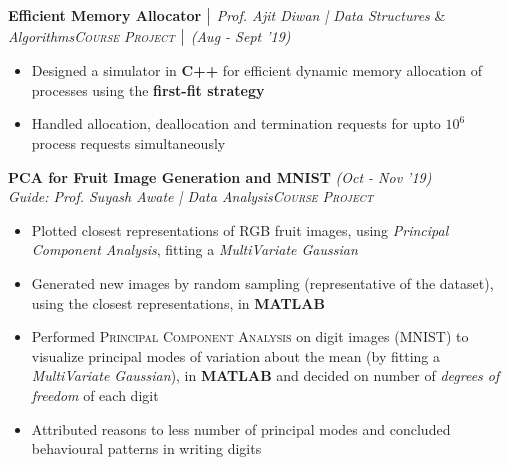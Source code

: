 \documentclass{article}
\begin{document}
\vspace{-5pt}
\textbf{Efficient Memory Allocator} $\bigm|$ {\it Prof. Ajit Diwan | Data Structures} \& {\it Algorithms}\hfill{\sl \small \textsc{Course Project} $\bigm|$ (Aug - Sept '19)}\\
\vspace{-19pt}
\begin{itemize}[itemsep = -1 mm, leftmargin=*]
  \item Designed a simulator in \textbf{C++} for efficient dynamic memory allocation of processes using the \textbf{first-fit strategy}
   \item Handled allocation, deallocation and termination requests for upto $10^{\text{6}}$ process requests simultaneously
\end{itemize}
\vspace{-5pt}
\textbf{PCA for Fruit Image Generation and MNIST} \hfill{\sl \small (Oct - Nov '19)}\\{\it Guide: Prof. Suyash Awate | Data Analysis}\hfill{\sl \small \textsc{Course Project}}\\
\vspace{-19pt}
\begin{itemize}[itemsep = -1 mm, leftmargin=*]
   \item Plotted closest representations of RGB fruit images, using \textit{Principal Component Analysis}, fitting a \textit{MultiVariate Gaussian}
    \item Generated new images by random sampling (representative of the dataset), using the closest representations, in \textbf{MATLAB}
    \item Performed \textsc{Principal Component Analysis} on digit images (MNIST) to visualize principal modes of variation about the mean (by fitting a \textit {MultiVariate Gaussian}), in \textbf{MATLAB} and decided on number of \textit{degrees of freedom} of each digit
    \item Attributed reasons to less number of principal modes and concluded behavioural patterns in writing digits
\end{itemize}
\end{document}
